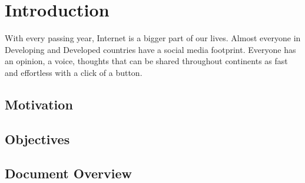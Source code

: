 \chapter{Introduction}
\label{cha:Intro}
\par 
With every passing year, Internet is a bigger part of our lives. Almost everyone in Developing and Developed countries have a social media footprint. Everyone has an opinion, a voice, thoughts that can be shared throughout continents as fast and effortless with a click of a button. 

\section{Motivation}
\label{sec:Motive}

\section{Objectives}
\label{sec:Objecgive}

\section{Document Overview}
\label{sec:Doc_Overview}

%
